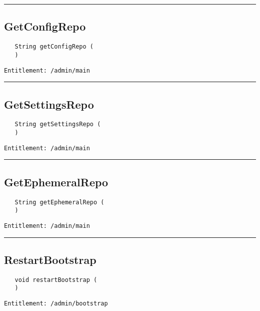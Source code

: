 \rule{12cm}{2pt}
\subsection{GetConfigRepo}
\label{Api:GetConfigRepo}
\begin{Verbatim}
   String getConfigRepo (
   )
\end{Verbatim}
\begin{Verbatim}[formatcom=\color{Maroon}]
  Entitlement: /admin/main
\end{Verbatim}



\rule{12cm}{2pt}
\subsection{GetSettingsRepo}
\label{Api:GetSettingsRepo}
\begin{Verbatim}
   String getSettingsRepo (
   )
\end{Verbatim}
\begin{Verbatim}[formatcom=\color{Maroon}]
  Entitlement: /admin/main
\end{Verbatim}



\rule{12cm}{2pt}
\subsection{GetEphemeralRepo}
\label{Api:GetEphemeralRepo}
\begin{Verbatim}
   String getEphemeralRepo (
   )
\end{Verbatim}
\begin{Verbatim}[formatcom=\color{Maroon}]
  Entitlement: /admin/main
\end{Verbatim}



\rule{12cm}{2pt}
\subsection{RestartBootstrap}
\label{Api:RestartBootstrap}
\begin{Verbatim}
   void restartBootstrap (
   )
\end{Verbatim}
\begin{Verbatim}[formatcom=\color{Maroon}]
  Entitlement: /admin/bootstrap
\end{Verbatim}



